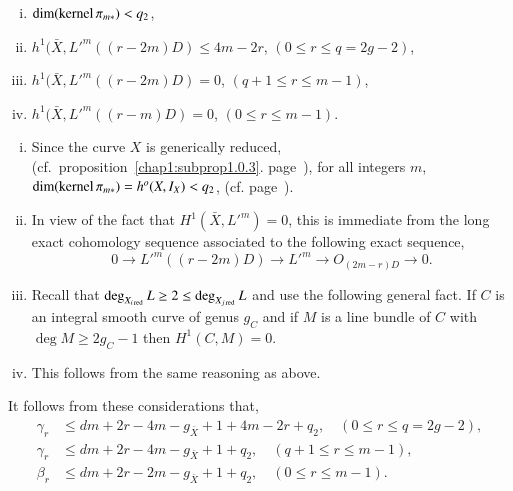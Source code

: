 {\medskip
{}
\begin{enumerate}[i)]
\item $\dim (\operatorname{kernel}  \pi_{m*}) < q_{2}$,\pageoriginale

\item $h^{1} (\bar{X}, {L'}^{m}((r-2m)D) \le 4m-2r$, $(0 \le r \le q =
  2g-2)$,  

\item $h^{1} (\bar{X}, {L'}^{m}((r-2m)D) = 0$, $(q + 1 \le r \le m-1)$,

\item $h^{1} (\bar{X}, {L'}^{m}((r-m)D) = 0$, $(0 \le r \le m-1)$.
\end{enumerate}

\medskip
{}
\begin{enumerate}[i)]
\item Since the curve $X$ is generically reduced, (cf.\ 
proposition~\ref{chap1:subprop1.0.3}. page~\pageref{chap1:subprop1.0.3}), for
all integers $m$, $\dim (\operatorname{kernel} \pi_{m*}) =  h^{o} (X , I_{X}) < q_{2}$, 
(cf. page~\pageref{c1:claim}).  

\item In view of the fact that $H^{1} (\bar{X}, L'^{m}) = 0 $, this is
  immediate from the long exact cohomology sequence associated to the
  following exact sequence,  
$$
0 \to L'^{m}((r-2m)D) \to L'^{m} \to O_{(2m-r)D} \to 0.
$$ 

\item Recall that $\deg_{X_{ i \operatorname{red}}} L \ge 2 \leq \deg_{X_{j \operatorname{red}}}L$
  and use the following general fact. If $C$ is an integral smooth
  curve of genus $g_{C}$ and if $M$ is a line bundle of $C$ with $\deg
  M \geq  2g_{C} -1$ then $H^{1} (C, M) = 0$.   

\item This follows from the same reasoning as above. 
\end{enumerate}

It follows from these considerations that, 
\begin{align*}
\gamma_{r} & \le  dm + 2r - 4m - g_{\bar{X}} + 1 + 4m - 2r + q_{2},
\quad (0 \le r \le q = 2g - 2),\\
\gamma_{r} & \le dm + 2r - 4m - g_{\bar{X}} + 1 + q_{2}, \quad (q+1
\le r \le m-1), \\ 
\beta_{r} &  \le dm + 2r - 2m - g_{\bar{X}} + 1 + q_{2}, \quad (0 \le
r \le m-1). 
\end{align*}

}
